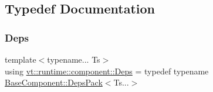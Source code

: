 \subsection{Typedef Documentation}
\mbox{\label{namespacevt_1_1runtime_1_1component_afad3a7a92e35d9ab3d81540d9275213c}} 
\subsubsection{\texorpdfstring{Deps}{Deps}}
{\footnotesize\ttfamily template$<$typename... Ts$>$ \\
using \hyperlink{namespacevt_1_1runtime_1_1component_afad3a7a92e35d9ab3d81540d9275213c}{vt\+::runtime\+::component\+::\+Deps} = typedef typename \hyperlink{structvt_1_1runtime_1_1component_1_1_base_component_1_1_deps_pack}{Base\+Component\+::\+Deps\+Pack}$<$Ts...$>$}


